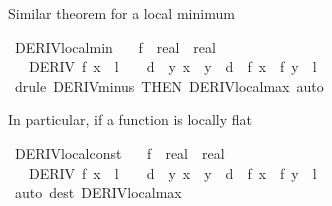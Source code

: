 \begin{isabellebody}
\begin{isamarkuptext}
Similar theorem for a local minimum%
\end{isamarkuptext}\isamarkuptrue%
\isamarkupfalse%
\ DERIV{\isacharunderscore}{\kern0pt}local{\isacharunderscore}{\kern0pt}min{\isacharcolon}{\kern0pt}\isanewline
\ \ \ f\ {\isacharcolon}{\kern0pt}{\isacharcolon}{\kern0pt}\ {\isachardoublequoteopen}real\ {\isasymRightarrow}\ real{\isachardoublequoteclose}\isanewline
\ \ \ {\isachardoublequoteopen}DERIV\ f\ x\ {\isacharcolon}{\kern0pt}{\isachargreater}{\kern0pt}\ l\ {\isasymLongrightarrow}\ {}\ {\isacharless}{\kern0pt}\ d\ {\isasymLongrightarrow}\ {\isasymforall}y{\isachardot}{\kern0pt}\ {\isasymbar}x\ {\isacharminus}{\kern0pt}\ y{\isasymbar}\ {\isacharless}{\kern0pt}\ d\ {\isasymlongrightarrow}\ f\ x\ {\isasymle}\ f\ y\ {\isasymLongrightarrow}\ l\ {\isacharequal}{\kern0pt}\ {}{\isachardoublequoteclose}\isanewline
%
\isadelimproof
\ \ %
\endisadelimproof
%
\isatagproof
{}\isamarkupfalse%
\ {\isacharparenleft}{\kern0pt}drule\ DERIV{\isacharunderscore}{\kern0pt}minus\ {\isacharbrackleft}{\kern0pt}THEN\ DERIV{\isacharunderscore}{\kern0pt}local{\isacharunderscore}{\kern0pt}max{\isacharbrackright}{\kern0pt}{\isacharparenright}{\kern0pt}\ auto%
\endisatagproof
{\isafoldproof}%
%
\isadelimproof
%
\endisadelimproof
%
\begin{isamarkuptext}%
In particular, if a function is locally flat%
\end{isamarkuptext}\isamarkuptrue%
\isamarkupfalse%
\ DERIV{\isacharunderscore}{\kern0pt}local{\isacharunderscore}{\kern0pt}const{\isacharcolon}{\kern0pt}\isanewline
\ \ \ f\ {\isacharcolon}{\kern0pt}{\isacharcolon}{\kern0pt}\ {\isachardoublequoteopen}real\ {\isasymRightarrow}\ real{\isachardoublequoteclose}\isanewline
\ \ \ {\isachardoublequoteopen}DERIV\ f\ x\ {\isacharcolon}{\kern0pt}{\isachargreater}{\kern0pt}\ l\ {\isasymLongrightarrow}\ {}\ {\isacharless}{\kern0pt}\ d\ {\isasymLongrightarrow}\ {\isasymforall}y{\isachardot}{\kern0pt}\ {\isasymbar}x\ {\isacharminus}{\kern0pt}\ y{\isasymbar}\ {\isacharless}{\kern0pt}\ d\ {\isasymlongrightarrow}\ f\ x\ {\isacharequal}{\kern0pt}\ f\ y\ {\isasymLongrightarrow}\ l\ {\isacharequal}{\kern0pt}\ {}{\isachardoublequoteclose}\isanewline
%
\isadelimproof
\ \ %
\endisadelimproof
%
\isatagproof
{}\isamarkupfalse%
\ {\isacharparenleft}{\kern0pt}auto\ dest{\isacharbang}{\kern0pt}{\isacharcolon}{\kern0pt}\ DERIV{\isacharunderscore}{\kern0pt}local{\isacharunderscore}{\kern0pt}max{\isacharparenright}{\kern0pt}%

\end{isabellebody}
